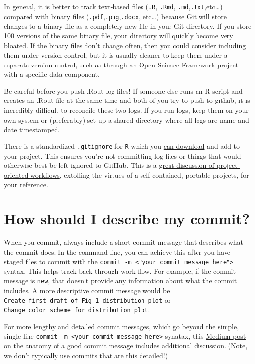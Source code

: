 \documentclass[]{book}
\begin{document}
In general, it is better to track text-based files (\texttt{.R}, \texttt{.Rmd}, \texttt{.md},\texttt{.txt},etc\ldots{}) compared with binary files (\texttt{.pdf},\texttt{.png},\texttt{.docx}, etc\ldots{}) because Git will store changes to a binary file as a completely new file in your Git directory. If you store 100 versions of the same binary file, your directory will quickly become very bloated. If the binary files don't change often, then you could consider including them under version control, but it is usually cleaner to keep them under a separate version control, such as through an Open Science Framework project with a specific data component.

Be careful before you push .Rout log files! If someone else runs an R script and creates an .Rout file at the same time and both of you try to push to github, it is incredibly difficult to reconcile these two logs. If you run logs, keep them on your own system or (preferably) set up a shared directory where all logs are name and date timestamped.

There is a standardized \texttt{.gitignore} for \texttt{R} which you \href{https://github.com/github/gitignore/blob/master/R.gitignore}{can download} and add to your project. This ensures you're not committing log files or things that would otherwise best be left ignored to GitHub. This is a \href{https://www.tidyverse.org/articles/2017/12/workflow-vs-script/}{great discussion of project-oriented workflows}, extolling the virtues of a self-contained, portable projects, for your reference.

\hypertarget{how-should-i-describe-my-commit}{%
\section{How should I describe my commit?}\label{how-should-i-describe-my-commit}}

When you commit, always include a short commit message that describes what the commit does. In the command line, you can achieve this after you have staged files to commit with the \texttt{commit\ -m\ \textless{}"your\ commit\ message\ here"\textgreater{}} syntax. This helps track-back through work flow. For example, if the commit message is \texttt{new}, that doesn't provide any information about what the commit includes. A more descriptive commit message would be \texttt{Create\ first\ draft\ of\ Fig\ 1\ distribution\ plot} or \texttt{Change\ color\ scheme\ for\ distribution\ plot}.

For more lengthy and detailed commit messages, which go beyond the simple, single line \texttt{commit\ -m\ \textless{}your\ commit\ message\ here\textgreater{}} synatax, this \href{https://medium.com/@andrewhowdencom/anatomy-of-a-good-commit-message-acd9c4490437}{Medium post} on the anatomy of a good commit message includes additional discussion. (Note, we don't typically use commits that are this detailed!)
\end{document}
